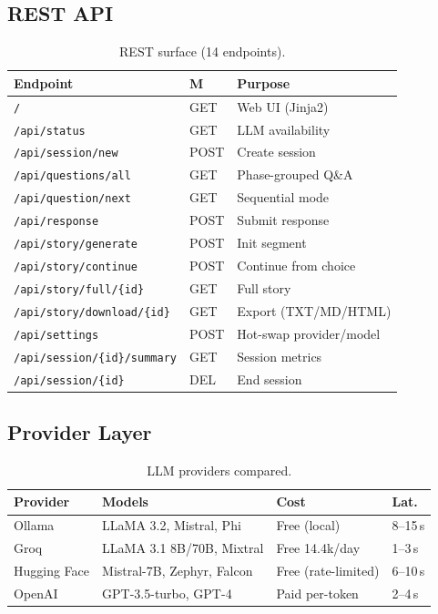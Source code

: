 \documentclass[conference,10pt,a4paper]{IEEEtran}
\begin{document}
\subsection{REST API}

\begin{table}[!t]
\caption{REST surface (14 endpoints).}
\label{tab:rest}
\centering
\renewcommand{\arraystretch}{1.1}
\begin{tabular}{@{}llp{}@{}}
\toprule
\textbf{Endpoint} & \textbf{M} & \textbf{Purpose} \\
\midrule
\texttt{/}                          & GET  & Web UI (Jinja2) \\
\texttt{/api/status}                & GET  & LLM availability \\
\texttt{/api/session/new}           & POST & Create session \\
\texttt{/api/questions/all}         & GET  & Phase-grouped Q\&A \\
\texttt{/api/question/next}         & GET  & Sequential mode \\
\texttt{/api/response}              & POST & Submit response \\
\texttt{/api/story/generate}        & POST & Init segment \\
\texttt{/api/story/continue}        & POST & Continue from choice \\
\texttt{/api/story/full/\{id\}}     & GET  & Full story \\
\texttt{/api/story/download/\{id\}} & GET  & Export (TXT/MD/HTML) \\
\texttt{/api/settings}              & POST & Hot-swap provider/model \\
\texttt{/api/session/\{id\}/summary}& GET  & Session metrics \\
\texttt{/api/session/\{id\}}        & DEL  & End session \\
\bottomrule
\end{tabular}
\end{table}

\subsection{Provider Layer}

\begin{table}[!t]
\caption{LLM providers compared.}
\label{tab:providers}
\centering
\renewcommand{\arraystretch}{1.1}
\begin{tabular}{@{}llll@{}}
\toprule
\textbf{Provider} & \textbf{Models} & \textbf{Cost} & \textbf{Lat.} \\
\midrule
Ollama        & LLaMA 3.2, Mistral, Phi    & Free (local)         & 8--15\,s \\
Groq          & LLaMA 3.1 8B/70B, Mixtral  & Free 14.4k/day       & 1--3\,s \\
Hugging Face  & Mistral-7B, Zephyr, Falcon & Free (rate-limited)  & 6--10\,s \\
OpenAI        & GPT-3.5-turbo, GPT-4       & Paid per-token        & 2--4\,s \\
\bottomrule
\end{tabular}
\end{table}
\end{document}
